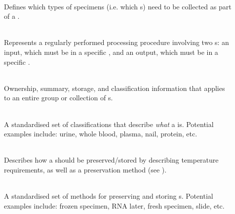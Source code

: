 \begin{description}

  \item[] \hfill \\ Defines
    which types of specimens (i.e. which s) need to
    be collected as part of a .

  \item[] \hfill \\ Represents a regularly
    performed processing procedure involving two s: an
    input, which must be in a specific , and an
    output, which must be in a specific .

  \item[] \hfill \\ Ownership, summary, storage,
    and classification information that applies to an entire group or
    collection of s.

  \item[] \hfill \\ A standardised set of
    classifications that describe \emph{what} a 
    is. Potential examples include: urine, whole blood, plasma, nail, protein,
    etc.

  \item[] \hfill \\ Describes how a
     should be preserved/stored by describing temperature
    requirements, as well as a preservation method (see
    ).

  \item[] \hfill \\ A standardised set of
    methods for preserving and storing s.  Potential
    examples include: frozen specimen, RNA later, fresh specimen, slide, etc.

  \item[\valobjtarget{}] \hfill \\

  \item[\valobjtarget{}] \hfill \\

  \item[\valobjtarget{}] \hfill \\


\end{description}
